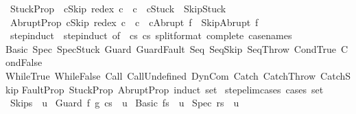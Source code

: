 \begin{isabellebody}
{\isacharbar}\ StuckProp{\isacharcolon}\ \ {\isachardoublequoteopen}{\isasymlbrakk}c{\isasymnoteq}Skip{\isacharsemicolon}\ redex\ c\ {\isacharequal}\ c{\isasymrbrakk}\ {\isasymLongrightarrow}\ {\isasymGamma}{\isasymturnstile}{\isacharparenleft}c{\isacharcomma}Stuck{\isacharparenright}\ {\isasymrightarrow}\ {\isacharparenleft}Skip{\isacharcomma}Stuck{\isacharparenright}{\isachardoublequoteclose}\isanewline
{\isacharbar}\ AbruptProp{\isacharcolon}\ {\isachardoublequoteopen}{\isasymlbrakk}c{\isasymnoteq}Skip{\isacharsemicolon}\ redex\ c\ {\isacharequal}\ c{\isasymrbrakk}\ {\isasymLongrightarrow}\ {\isasymGamma}{\isasymturnstile}{\isacharparenleft}c{\isacharcomma}Abrupt\ f{\isacharparenright}\ {\isasymrightarrow}\ {\isacharparenleft}Skip{\isacharcomma}Abrupt\ f{\isacharparenright}{\isachardoublequoteclose}\isanewline
\isanewline
\isanewline
{}\isamarkupfalse%
\ step{\isacharunderscore}induct\ {\isacharequal}\ step{\isachardot}induct\ {\isacharbrackleft}of\ {\isacharunderscore}\ {\isachardoublequoteopen}{\isacharparenleft}c{\isacharcomma}s{\isacharparenright}{\isachardoublequoteclose}\ {\isachardoublequoteopen}{\isacharparenleft}c{\isacharprime}{\isacharcomma}s{\isacharprime}{\isacharparenright}{\isachardoublequoteclose}{\isacharcomma}\ split{\isacharunderscore}format\ {\isacharparenleft}complete{\isacharparenright}{\isacharcomma}\ case{\isacharunderscore}names\isanewline
Basic\ Spec\ SpecStuck\ Guard\ GuardFault\ Seq\ SeqSkip\ SeqThrow\ CondTrue\ CondFalse\isanewline
WhileTrue\ WhileFalse\ Call\ CallUndefined\ DynCom\ Catch\ CatchThrow\ CatchSkip\isanewline
FaultProp\ StuckProp\ AbruptProp{\isacharcomma}\ induct\ set{\isacharbrackright}\isanewline
\isanewline
\isanewline
{}\isamarkupfalse%
\ step{\isacharunderscore}elim{\isacharunderscore}cases\ {\isacharbrackleft}cases\ set{\isacharbrackright}{\isacharcolon}\isanewline
\ {\isachardoublequoteopen}{\isasymGamma}{\isasymturnstile}{\isacharparenleft}Skip{\isacharcomma}s{\isacharparenright}\ {\isasymrightarrow}\ u{\isachardoublequoteclose}\isanewline
\ {\isachardoublequoteopen}{\isasymGamma}{\isasymturnstile}{\isacharparenleft}Guard\ f\ g\ c{\isacharcomma}s{\isacharparenright}\ {\isasymrightarrow}\ u{\isachardoublequoteclose}\isanewline
\ {\isachardoublequoteopen}{\isasymGamma}{\isasymturnstile}{\isacharparenleft}Basic\ f{\isacharcomma}s{\isacharparenright}\ {\isasymrightarrow}\ u{\isachardoublequoteclose}\isanewline
\ {\isachardoublequoteopen}{\isasymGamma}{\isasymturnstile}{\isacharparenleft}Spec\ r{\isacharcomma}s{\isacharparenright}\ {\isasymrightarrow}\ u{\isachardoublequoteclose}\isanewline

\end{isabellebody}
